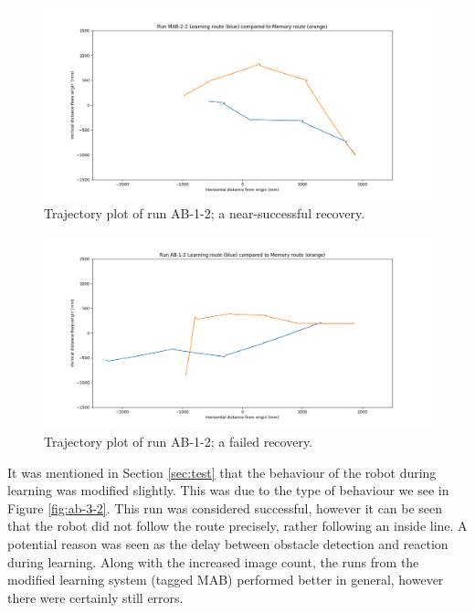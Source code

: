 \documentclass[a4paper,12pt]{article}
\begin{document}
\begin{figure}
 \centering
  \includegraphics[width=\textwidth]{MAB-2-2}
  \caption{
    \label{fig:mab-2-2-succ} Trajectory plot of run AB-1-2; a near-successful recovery.
  }
\end{figure}


\begin{figure}
 \centering
  \includegraphics[width=\textwidth]{AB-1-2}
  \caption{
    \label{fig:ab-1-2-fail} Trajectory plot of run AB-1-2; a failed recovery.
  }
\end{figure}

It was mentioned in Section \ref{sec:test} that the behaviour of the robot during learning was modified slightly. This
was due to the type of behaviour we see in Figure \ref{fig:ab-3-2}. This run was considered successful, however it can be seen
that the robot did not follow the route precisely, rather following an inside line. A potential reason was seen as the
delay between obstacle detection and reaction during learning. Along with the increased image count, the runs from
the modified learning system (tagged MAB) performed better in general, however there were certainly still errors.
\newline
\end{document}
